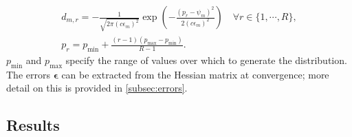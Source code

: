 \begin{subequations}
    \begin{gather}
        d_{m,r} = -\frac{1}{\sqrt{2 \pi (c \epsilon_m)^2}}
        \exp\left(
            - \frac{(p_r - \psi_m)^2}{2 (c \epsilon_m)^2}
        \right)\quad \forall r \in \lbrace 1, \cdots, R \rbrace,\\
        p_r = p_{\text{min}} + \frac{(r-1) (p_{\text{max}} - p_{\text{min}})}{R-1}.
    \end{gather}
    \label{eq:distribution}%
\end{subequations}
$p_{\text{min}}$ and $p_{\text{max}}$ specify the range of values over which to
generate the distribution.
The errors $\symbf{\epsilon}$ can be extracted from the Hessian matrix at
convergence; more detail on this is provided in \cref{subsec:errors}.

\subsection{Results}
\label{subsec:seq-results}
